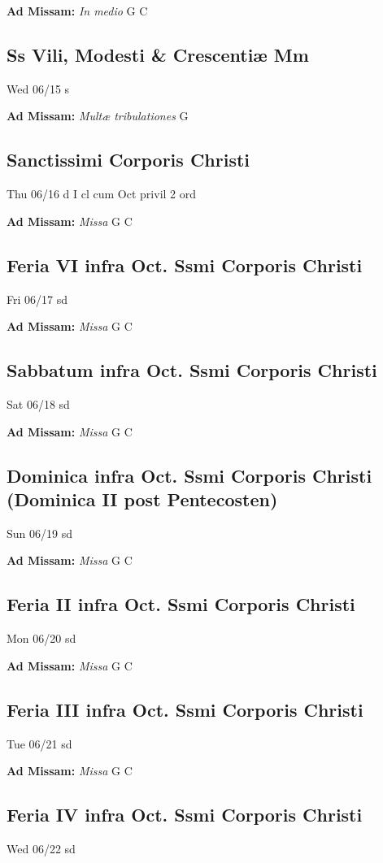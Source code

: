 \documentclass[letterpaper, 10pt, twocolumn]{article}
\begin{document}
\textbf{Ad Missam:} \textit{In medio} G C 

\subsection*{Ss Vili, Modesti \& Crescentiæ Mm}Wed 06/15 s

\textbf{Ad Missam:} \textit{Multæ tribulationes} G 

\subsection*{Sanctissimi Corporis Christi}Thu 06/16 d I cl cum Oct privil 2 ord

\textbf{Ad Missam:} \textit{Missa} G C 

\subsection*{Feria VI infra Oct. Ssmi Corporis Christi}Fri 06/17 sd

\textbf{Ad Missam:} \textit{Missa} G C 

\subsection*{Sabbatum infra Oct. Ssmi Corporis Christi}Sat 06/18 sd

\textbf{Ad Missam:} \textit{Missa} G C 

\subsection*{Dominica infra Oct. Ssmi Corporis Christi (Dominica II post Pentecosten)}Sun 06/19 sd

\textbf{Ad Missam:} \textit{Missa} G C 

\subsection*{Feria II infra Oct. Ssmi Corporis Christi}Mon 06/20 sd

\textbf{Ad Missam:} \textit{Missa} G C 

\subsection*{Feria III infra Oct. Ssmi Corporis Christi}Tue 06/21 sd

\textbf{Ad Missam:} \textit{Missa} G C 

\subsection*{Feria IV infra Oct. Ssmi Corporis Christi}Wed 06/22 sd
\end{document}
